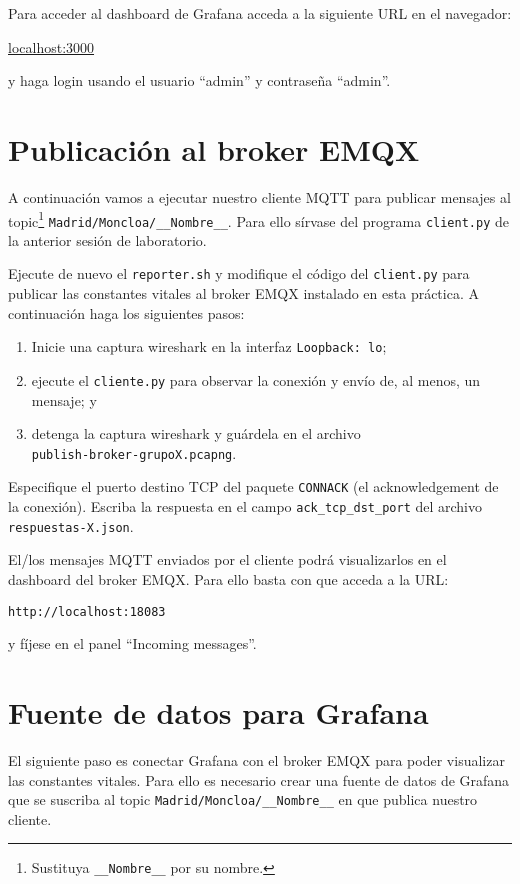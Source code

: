 \documentclass{upmassignment}
\begin{document}
Para acceder al dashboard de Grafana
acceda a la siguiente URL en el navegador:
\begin{center}
\url{localhost:3000}
\end{center}
y haga login usando el usuario
``admin'' y contraseña ``admin''.



\section*{Publicación al broker EMQX}
A continuación vamos a ejecutar nuestro
cliente MQTT para publicar mensajes al
topic\footnote{Sustituya \texttt{\_\_Nombre\_\_}
por su nombre.}
\texttt{Madrid/Moncloa/\_\_Nombre\_\_}.
Para ello sírvase del programa
\texttt{client.py} de la anterior sesión de
laboratorio. 


Ejecute de nuevo el \texttt{reporter.sh}
y modifique el código del \texttt{client.py}
para publicar las constantes vitales
al broker EMQX instalado
en esta práctica.
A continuación haga los siguientes pasos:
\begin{enumerate}
    \item Inicie una captura wireshark
        en la interfaz \texttt{Loopback: lo};
    \item ejecute el \texttt{cliente.py}
        para observar la conexión y
        envío de, al menos, un mensaje; y
    \item detenga la captura wireshark y
        guárdela en el archivo\\
        \texttt{publish-broker-grupoX.pcapng}.
\end{enumerate}

\begin{problemlist}
    \pbitem Especifique el puerto
        destino TCP del paquete
        \texttt{CONNACK} (el acknowledgement
        de la conexión).
        Escriba la respuesta en el
        campo \texttt{ack\_tcp\_dst\_port}
        del archivo \texttt{respuestas-X.json}.
\end{problemlist}


El/los mensajes MQTT enviados por el cliente
podrá visualizarlos en el dashboard del
broker EMQX. Para ello basta con que acceda
a la URL:
\begin{center}
    \texttt{http://localhost:18083}
\end{center}
y fíjese en el panel
``Incoming messages''.






\section*{Fuente de datos para Grafana}
El siguiente paso es conectar Grafana
con el broker EMQX para poder visualizar
las constantes vitales.
Para ello es necesario crear una fuente
de datos de Grafana que se suscriba al topic
\texttt{Madrid/Moncloa/\_\_Nombre\_\_}
en que publica nuestro cliente.
\end{document}
